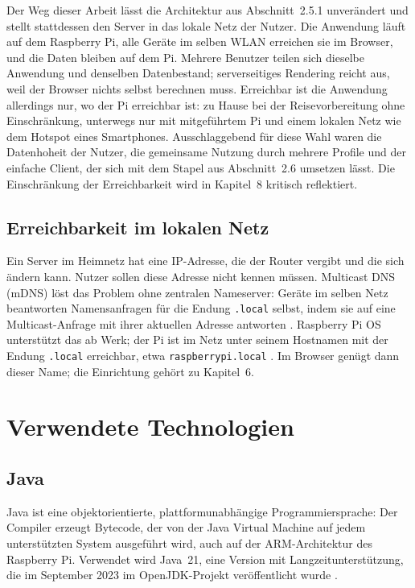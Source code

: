 \documentclass[12pt,a4paper]{scrreprt}
\begin{document}
Der Weg dieser Arbeit lässt die Architektur aus Abschnitt~2.5.1 unverändert und stellt stattdessen den Server in das lokale Netz der Nutzer. Die Anwendung läuft auf dem Raspberry Pi, alle Geräte im selben WLAN erreichen sie im Browser, und die Daten bleiben auf dem Pi. Mehrere Benutzer teilen sich dieselbe Anwendung und denselben Datenbestand; serverseitiges Rendering reicht aus, weil der Browser nichts selbst berechnen muss. Erreichbar ist die Anwendung allerdings nur, wo der Pi erreichbar ist: zu Hause bei der Reisevorbereitung ohne Einschränkung, unterwegs nur mit mitgeführtem Pi und einem lokalen Netz wie dem Hotspot eines Smartphones. Ausschlaggebend für diese Wahl waren die Datenhoheit der Nutzer, die gemeinsame Nutzung durch mehrere Profile und der einfache Client, der sich mit dem Stapel aus Abschnitt~2.6 umsetzen lässt. Die Einschränkung der Erreichbarkeit wird in Kapitel~8 kritisch reflektiert.

\subsection{Erreichbarkeit im lokalen Netz}
Ein Server im Heimnetz hat eine IP-Adresse, die der Router vergibt und die sich ändern kann. Nutzer sollen diese Adresse nicht kennen müssen. Multicast DNS (mDNS) löst das Problem ohne zentralen Nameserver: Geräte im selben Netz beantworten Namensanfragen für die Endung \texttt{.local} selbst, indem sie auf eine Multicast-Anfrage mit ihrer aktuellen Adresse antworten \cite{rfc6762}. Raspberry Pi OS unterstützt das ab Werk; der Pi ist im Netz unter seinem Hostnamen mit der Endung \texttt{.local} erreichbar, etwa \texttt{raspberrypi.local} \cite{piremote}. Im Browser genügt dann dieser Name; die Einrichtung gehört zu Kapitel~6.

\section{Verwendete Technologien}

\subsection{Java}
Java ist eine objektorientierte, plattformunabhängige Programmiersprache: Der Compiler erzeugt Bytecode, der von der Java Virtual Machine auf jedem unterstützten System ausgeführt wird, auch auf der ARM-Architektur des Raspberry Pi. Verwendet wird Java~21, eine Version mit Langzeitunterstützung, die im September 2023 im OpenJDK-Projekt veröffentlicht wurde \cite{openjdk21}.
\end{document}
